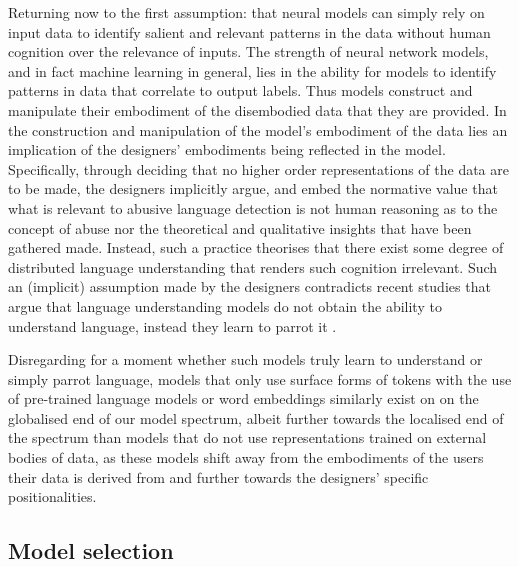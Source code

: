 Returning now to the first assumption: that neural models can simply rely on input data to identify salient and relevant patterns in the data without human cognition over the relevance of inputs. The strength of neural network models, and in fact machine learning in general, lies in the ability for models to identify patterns in data that correlate to output labels. Thus models construct and manipulate their embodiment of the disembodied data that they are provided. In the construction and manipulation of the model's embodiment of the data lies an implication of the designers' embodiments being reflected in the model. Specifically, through deciding that no higher order representations of the data are to be made, the designers implicitly argue, and embed the normative value that what is relevant to abusive language detection is not human reasoning as to the concept of abuse nor the theoretical and qualitative insights that have been gathered made. Instead, such a practice theorises that there exist some degree of distributed language understanding that renders such cognition irrelevant. Such an (implicit) assumption made by the designers contradicts recent studies that argue that language understanding models do not obtain the ability to understand language, instead they learn to parrot it \cite{Bender-Kohler:2020}.

Disregarding for a moment whether such models truly learn to understand or simply parrot language, models that only use surface forms of tokens with the use of pre-trained language models or word embeddings similarly exist on on the globalised end of our model spectrum, albeit further towards the localised end of the spectrum than models that do not use representations trained on external bodies of data, as these models shift away from the embodiments of the users their data is derived from and further towards the designers' specific positionalities.

\subsection{Model selection}

